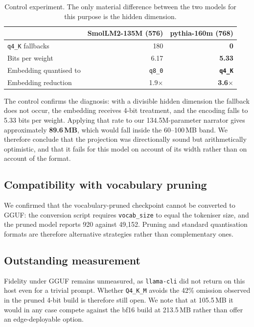 \documentclass[11pt,a4paper]{article}
\newcommand{\code}[1]{\texttt{\small #1}}
\begin{document}
\begin{table}[H]
\caption{Control experiment. The only material difference between the two models
for this purpose is the hidden dimension.}
\begin{tabularx}{\textwidth}{@{}Yrr@{}}
\toprule
& \textbf{SmolLM2-135M (576)} & \textbf{pythia-160m (768)} \\
\midrule
\code{q4\_K} fallbacks        & 180        & \textbf{0} \\
Bits per weight               & 6.17       & \textbf{5.33} \\
Embedding quantised to        & \code{q8\_0} & \textbf{\code{q4\_K}} \\
Embedding reduction           & 1.9$\times$ & \textbf{3.6$\times$} \\
\bottomrule
\end{tabularx}
\end{table}

The control confirms the diagnosis: with a divisible hidden dimension the
fallback does not occur, the embedding receives 4-bit treatment, and the encoding
falls to 5.33 bits per weight. Applying that rate to our 134.5M-parameter
narrator gives approximately \textbf{89.6\,MB}, which would fall inside the
60--100\,MB band. We therefore conclude that the projection was directionally
sound but arithmetically optimistic, and that it fails for this model on account
of its width rather than on account of the format.

\subsection{Compatibility with vocabulary pruning}

We confirmed that the vocabulary-pruned checkpoint cannot be converted to GGUF:
the conversion script requires \code{vocab\_size} to equal the tokeniser size,
and the pruned model reports 920 against 49{,}152. Pruning and standard
quantisation formats are therefore alternative strategies rather than
complementary ones.

\subsection{Outstanding measurement}

Fidelity under GGUF remains unmeasured, as \code{llama-cli} did not return on
this host even for a trivial prompt. Whether \code{Q4\_K\_M} avoids the 42\%
omission observed in the pruned 4-bit build is therefore still open. We note
that at 105.5\,MB it would in any case compete against the bf16 build at
213.5\,MB rather than offer an edge-deployable option.
\end{document}
